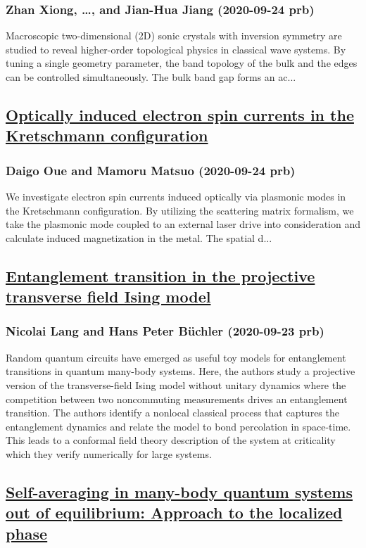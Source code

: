 \subsubsection*{Zhan Xiong, \dots, and Jian-Hua Jiang (2020-09-24 prb)}
Macroscopic two-dimensional (2D) sonic crystals with inversion symmetry are studied to reveal higher-order topological physics in classical wave systems. By tuning a single geometry parameter, the band topology of the bulk and the edges can be controlled simultaneously. The bulk band gap forms an ac...
\subsection*{\href{http://link.aps.org/doi/10.1103/PhysRevB.102.125431}{Optically induced electron spin currents in the Kretschmann configuration}}
\subsubsection*{Daigo Oue and Mamoru Matsuo (2020-09-24 prb)}
We investigate electron spin currents induced optically via plasmonic modes in the Kretschmann configuration. By utilizing the scattering matrix formalism, we take the plasmonic mode coupled to an external laser drive into consideration and calculate induced magnetization in the metal. The spatial d...
\subsection*{\href{http://link.aps.org/doi/10.1103/PhysRevB.102.094204}{Entanglement transition in the projective transverse field Ising model}}
\subsubsection*{Nicolai Lang and Hans Peter Büchler (2020-09-23 prb)}
Random quantum circuits have emerged as useful toy models for entanglement transitions in quantum many-body systems. Here, the authors study a projective version of the transverse-field Ising model without unitary dynamics where the competition between two noncommuting measurements drives an entanglement transition. The authors identify a nonlocal classical process that captures the entanglement dynamics and relate the model to bond percolation in space-time. This leads to a conformal field theory description of the system at criticality which they verify numerically for large systems.
\subsection*{\href{http://link.aps.org/doi/10.1103/PhysRevB.102.094310}{Self-averaging in many-body quantum systems out of equilibrium: Approach to the localized phase}}
